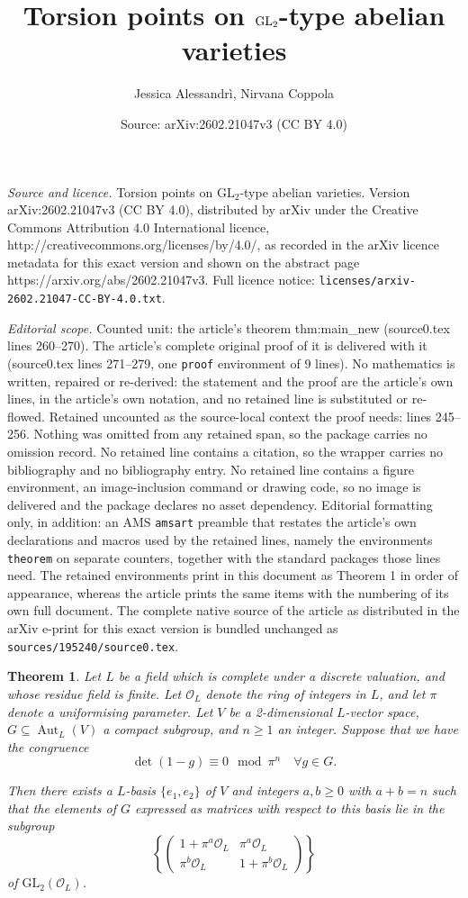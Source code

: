 \documentclass[10pt,a4paper]{amsart}
\title{Torsion points on \(\GL_2\)-type abelian varieties}
\author{Jessica Alessandr\`i, Nirvana Coppola}
\date{Source: arXiv:2602.21047v3 (CC BY 4.0)}
\newtheorem{theorem}{Theorem}
\DeclareMathOperator{\Aut}{Aut}
\newcommand{\GL}{\text{GL}}
\newcommand{\mat}[4]{\left(\begin{array}{cc}
#1 &#2\\
#3 &#4
\end{array}\right)}
\begin{document}
\maketitle

\noindent\emph{Source and licence.} Torsion points on \(\GL_2\)-type abelian varieties. Version arXiv:2602.21047v3 (CC BY 4.0), distributed by arXiv under the Creative Commons Attribution 4.0 International licence, http://creativecommons.org/licenses/by/4.0/, as recorded in the arXiv licence metadata for this exact version and shown on the abstract page https://arxiv.org/abs/2602.21047v3. Full licence notice: \texttt{licenses/arxiv-2602.21047-CC-BY-4.0.txt}.\par\smallskip

\noindent\textit{Editorial scope.} Counted unit: the article's theorem thm:main\_new (source0.tex lines 260--270). The article's complete original proof of it is delivered with it (source0.tex lines 271--279, one \texttt{proof} environment of 9 lines). No mathematics is written, repaired or re-derived: the statement and the proof are the article's own lines, in the article's own notation, and no retained line is substituted or re-flowed.  Retained uncounted as the source-local context the proof needs: lines 245--256.  Nothing was omitted from any retained span, so the package carries no omission record.  No retained line contains a citation, so the wrapper carries no bibliography and no bibliography entry.  No retained line contains a figure environment, an image-inclusion command or drawing code, so no image is delivered and the package declares no asset dependency.  Editorial formatting only, in addition: an AMS \texttt{amsart} preamble that restates the article's own declarations and macros used by the retained lines, namely the environments \texttt{theorem} on separate counters, together with the standard packages those lines need.  The retained environments print in this document as Theorem 1 in order of appearance, whereas the article prints the same items with the numbering of its own full document.  The complete native source of the article as distributed in the arXiv e-print for this exact version is bundled unchanged as \texttt{sources/195240/source0.tex}.
\begin{theorem}\label{thm:Katz}
    Let \(L\) be a field which is complete under a discrete valuation, and whose residue field is finite. Let \(\mathcal{O}_L\) denote the ring of integers in \(L\), and let \(\pi\) denote a uniformising parameter. Let \(V\) be a 2-dimensional \(L\)-vector space, \(G \subseteq \Aut_L(V)\) a compact subgroup, and \(n \ge 1\) an integer. Suppose that we have the congruence
    \[
    \det(1-g) \equiv 0 \mod \pi^n \quad \forall g \in G.
    \]

    Then there exists a \(L\)-basis \(\{e_1,e_2\}\) of \(V\) and integers \(a,b \ge 0\) with \(a+b=n\) such that the elements of \(G\) expressed as matrices with respect to this basis lie in the subgroup
    \[
    \left\lbrace \mat{1 + \pi^a \mathcal{O}_L}{\pi^a \mathcal{O}_L}{\pi^b \mathcal{O}_L}{1 + \pi^b \mathcal{O}_L} \right\rbrace
    \]
    of \(\GL_2(\mathcal{O}_L)\).
\end{theorem}
\end{document}
